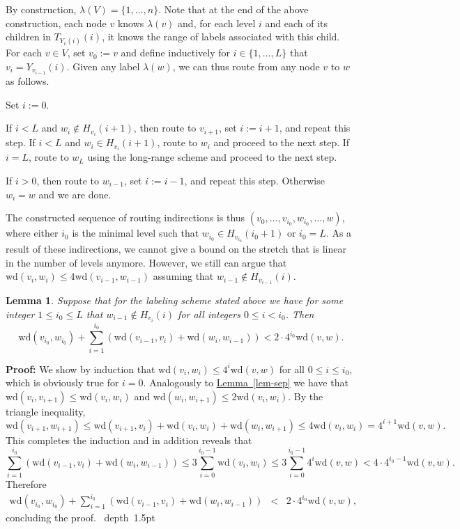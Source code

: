\documentclass[letterpaper,11pt]{article}
\newcommand{\namedref}[2]{\hyperref[#2]{#1~\ref*{#2}}}
\newcommand{\lemmaref}[1]{\namedref{Lemma}{#1}}
\newtheorem{lemma}[theorem]{Lemma}
\newcommand{\blackslug}{\hbox{\hskip 1pt \vrule width 4pt height 8pt
depth 1.5pt \hskip 1pt}}
\newcommand{\QED}{\quad\blackslug\lower 8.5pt\null\par}
\newenvironment{proof}[1][Proof:]{\noindent \textbf{#1}\xspace}{\QED}
\newcommand{\Wd}{\mathrm{wd}}
\newcommand{\Lead}{Y}
\begin{document}
By construction, $\lambda(V)=\{1,\ldots,n\}$. Note that at the end of the above
construction, each node $v$ knows $\lambda(v)$ and, for each level $i$ and each
of its children in $T_{\Lead_v(i)}(i)$, it knows the range of labels associated
with this child. For each $v\in V$, set $v_0:=v$ and define inductively for
$i\in \{1,\ldots,L\}$ that $v_i=\Lead_{v_{i-1}}(i)$. Given any label
$\lambda(w)$, we can thus route from any node $v$ to $w$ as follows.
\begin{compactenum}
\item Set $i:=0$.
\item If $i<L$ and $w_i\notin H_{v_i}(i+1)$, then route to $v_{i+1}$, set
$i:=i+1$, and repeat this step. If $i<L$ and $w_i\in H_{v_i}(i+1)$, route to
$w_i$ and proceed to the next step. If $i=L$, route to $w_L$ using the
long-range scheme and proceed to the next step.
\item If $i>0$, then route to $w_{i-1}$, set $i:=i-1$, and repeat this step.
Otherwise $w_i=w$ and we are done.
\end{compactenum}
The constructed sequence of routing indirections is thus
$(v_0,\ldots,v_{i_0},w_{i_0},\ldots,w)$, where either $i_0$ is the minimal
level such that $w_{i_0}\in H_{v_{i_0}}(i_0+1)$ or $i_0=L$. As a result of these
indirections, we cannot give a bound on the stretch that is linear in the
number of levels anymore. However, we still can argue that $\Wd(v_i,w_i)\leq
4\Wd(v_{i-1},w_{i-1})$ assuming that $w_{i-1}\not \in H_{v_{i-1}}(i)$.
\begin{lemma}\label{lem-stretch-unique}
Suppose that for the labeling scheme stated above we have for some integer
$1\leq i_0\leq L$ that $w_{i-1}\not \in H_{v_i}(i)$ for all integers $0\leq
i<i_0$.
Then
\begin{equation*}
\Wd(v_{i_0},w_{i_0})+\sum_{i=1}^{i_0}(\Wd(v_{i-1},v_i)+\Wd(w_i,w_{i-1}))
< 2\cdot 4^{i_0}\Wd(v,w).
\end{equation*}
\end{lemma}
\begin{proof}
We show by induction that $\Wd(v_i,w_i)\leq 4^i\Wd(v,w)$ for all $0\leq i\leq
i_0$, which is obviously true for $i=0$. Analogously to \lemmaref{lem-sep} we
have that $\Wd(v_i,v_{i+1})\leq \Wd(v_i,w_i)$ and $\Wd(w_i,w_{i+1})\leq
2\Wd(v_i,w_i)$. By the triangle inequality,
\begin{equation*}
\Wd(v_{i+1},w_{i+1})\leq \Wd(v_{i+1},v_i)+\Wd(v_i,w_i)+\Wd(w_i,w_{i+1})\leq
4\Wd(v_i,w_i)=4^{i+1}\Wd(v,w).
\end{equation*}
This completes the induction and in addition reveals that
\begin{equation*}
\sum_{i=1}^{i_0}(\Wd(v_{i-1},v_i)+\Wd(w_i,w_{i-1}))\leq
3\sum_{i=0}^{i_0-1}\Wd(v_i,w_i)\leq 3\sum_{i=0}^{i_0-1}4^i\Wd(v,w)
<4\cdot 4^{i_0-1}\Wd(v,w).
\end{equation*}
Therefore
\begin{eqnarray*}
\Wd(v_{i_0},w_{i_0})+\sum_{i=1}^{i_0}(\Wd(v_{i-1},v_i)+\Wd(w_i,w_{i-1}))
&<& 2\cdot 4^{i_0}\Wd(v,w),
\end{eqnarray*}
concluding the proof.
\end{proof}
\end{document}
